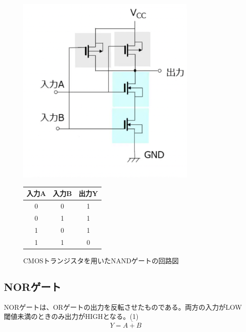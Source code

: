 \documentclass{jlreq}
\numberwithin{equation}{section}
\begin{document}
\begin{figure}[H]
  \centering
  \begin{minipage}{0.45\textwidth}
    \centering
    \includegraphics[width=0.8\textwidth]{assets/nand.png}
    \caption{CMOSトランジスタを用いたNANDゲートの回路図}
    \label{fig:nand_gate}
  \end{minipage}
  \hfill
  \begin{minipage}{0.45\textwidth}
    \centering
    \label{tab:nand_truth_table}
    \begin{tabular}{|c|c|c|}
      \hline
      入力A & 入力B & 出力Y \\ \hline
      0     & 0     & 1     \\ \hline
      0     & 1     & 1     \\ \hline
      1     & 0     & 1     \\ \hline
      1     & 1     & 0     \\ \hline
    \end{tabular}
  \end{minipage}
\end{figure}

\subsection{NORゲート}
NORゲートは、ORゲートの出力を反転させたものである。両方の入力がLOW閾値未満のときのみ出力がHIGHとなる。(1)
\begin{equation}
  Y = \overline{A + B} 
\end{equation}
\end{document}
